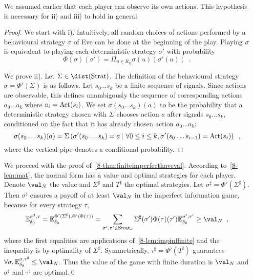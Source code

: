 We assumed earlier that each player can observe
its own actions. This hypothesis is necessary for ii) and iii)
to hold in general.

\begin{proof}
We start with i).
Intuitively,
all random choices of actions performed by
a behavioural strategy $\sigma$ of Eve can be done at the beginning of the play.
Playing $\sigma$ 
is equivalent to playing each deterministic strategy $\sigma'$ 
with probability
\[
\Phi(\sigma)(\sigma') = 
\Pi_{u \in R_E} \sigma(u)(\sigma'(u))\enspace.
\]

We prove ii).
Let $\Sigma\in\dist(\Strat)$. The definition of the behavioural strategy
$\sigma=\Phi'(\Sigma)$ is as follows.
Let $s_0\ldots s_k$ be a finite sequence of signals.
Since actions are observable, this defines unambigously
the sequence of corresponding actions $a_0\ldots a_k$
where $a_i = \text{Act}(s_i)$.
We set $\sigma(s_0\ldots s_k)(a)$ to be the probability that a 
deterministic strategy
chosen with $\Sigma$ chooses action $a$ after signals
$s_0\ldots s_k$, conditioned on the fact that it has already
chosen action $a_0\ldots a_k$:
\[
\sigma(s_0\ldots s_k)(a) 
=
\Sigma\left(\sigma'(s_0\ldots s_k)=a \mid \forall 0\leq i \leq k,
 \sigma'(s_0\ldots s_{i-1})=\text{Act}(s_i)\right)\enspace,
\]
where the vertical pipe denotes a conditional probability.
\end{proof}

We proceed with the proof of~\cref{8-thm:finiteimperfecthaveval}.
According to~\cref{8-lem:mat},
the normal form has a value and optimal strategies
for each player. 
Denote $\val_N$ the value
and $\Sigma^\sharp$ and $T^\sharp$ the optimal strategies.
Let $\sigma^\sharp=\Phi'(\Sigma^\sharp)$.
Then $\sigma^\sharp$ ensures a payoff
of at least $\val_N$ in the imperfect information game,
because for every strategy $\tau$,
\[
\mathbb{E}_{\ini}^{\sigma^\sharp,\tau}
=
\mathbb{E}_{\ini}^{\Phi'(\Sigma^\sharp),\Phi'(\Phi(\tau))}
=
\sum_{\sigma',\tau' \in \Strat_d}\Sigma^\sharp(\sigma') \Phi(\tau)(\tau')
\mathbb{E}_{\ini}^{\sigma',\tau'}
\geq \val_N\enspace,
\]
where the first equalities are applications of~\cref{8-lem:impinffinite}
and the inequality is by optimality of $\Sigma^\sharp$.
Symmetrically, 
$\tau^\sharp=\Phi'(T^\sharp)$ guarantees 
$\forall \sigma,\mathbb{E}_{\ini}^{\sigma,\tau^\sharp}\leq\val_N$. 
Thus the value of the game with finite duration
is $\val_N$ and $\sigma^\sharp$
and $\tau^\sharp$ are optimal.\qed

